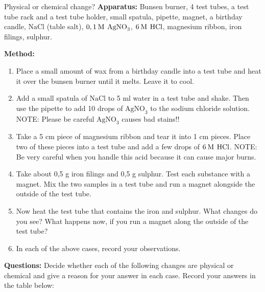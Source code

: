             \begin{Investigation}{Physical or chemical change? }
            \nopagebreak
        \label{m38709*id63636}\noindent{}\textbf{Apparatus:}
Bunsen burner, 4 test tubes, a test tube rack and a test tube holder, small spatula, pipette, magnet, a birthday candle, $\mathrm{NaCl}$ (table salt), $0,1\phantom{\rule{2pt}{0ex}}\mathrm{M}\phantom{\rule{4pt}{0ex}}{\mathrm{AgNO}}_{3}$, $6\phantom{\rule{2pt}{0ex}}\mathrm{M}\phantom{\rule{4pt}{0ex}}\mathrm{HCl}$, magnesium ribbon, iron filings, sulphur.\par 
        \label{m38709*eip-118}
	\par
      \label{m38709*id62113}\noindent{}\textbf{Method:}
        \label{m38709*id62119}\begin{enumerate}[noitemsep, label=\textbf{\arabic*}. ] 
            \label{m38709*uid27}\item Place a small amount of wax from a birthday candle into a test tube and heat it over the bunsen burner until it melts. Leave it to cool.
\label{m38709*uid28}\item Add a small spatula of $\mathrm{NaCl}$ to 5 ml water in a test tube and shake. Then use the pipette to add 10 drops of ${\mathrm{AgNO}}_{3}$ to the sodium chloride solution. NOTE: Please be careful ${\mathrm{AgNO}}_{3}$ causes bad stains!!
\label{m38709*uid29}\item Take a 5 cm piece of magnesium ribbon and tear it into 1 cm pieces. Place two of these pieces into a test tube and add a few drops of $6\phantom{\rule{2pt}{0ex}}\mathrm{M}\phantom{\rule{4pt}{0ex}}\mathrm{HCl}$. NOTE: Be very careful when you handle this acid because it can cause major burns.
\label{m38709*uid30}\item Take about 0,5 g iron filings and 0,5 g sulphur. Test each substance with a magnet. Mix the two samples in a test tube and run a magnet alongside the outside of the test tube.
\label{m38709*uid31}\item Now heat the test tube that contains the iron and sulphur. What changes do you see? What happens now, if you run a magnet along the outside of the test tube?
\label{m38709*uid32}\item In each of the above cases, record your observations.
\end{enumerate}
        \par 
        \label{m38709*id63979}\noindent{}\textbf{Questions:}
Decide whether each of the following changes are physical or chemical and give a reason for your answer in each case. Record your answers in the table below:

\end{Investigation}

